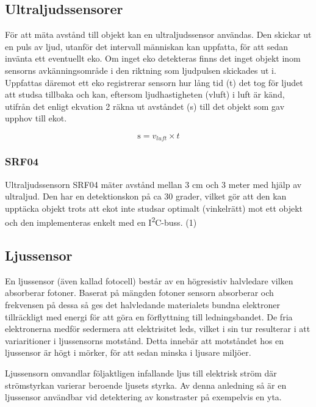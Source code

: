 \documentclass[11pt]{article}
\begin{document}
\begin{flushleft}


\subsection{Ultraljudssensorer}
För att mäta avstånd till objekt kan en ultraljudssensor användas. Den skickar ut en puls av ljud, utanför det intervall människan kan uppfatta, för att sedan invänta ett eventuellt eko. Om inget eko detekteras finns det inget objekt inom sensorns avkänningsområde i den riktning som ljudpulsen skickades ut i. Uppfattas däremot ett eko registrerar sensorn hur lång tid (t) det tog för ljudet att studsa tillbaka och kan, eftersom ljudhastigheten (vluft) i luft är känd, utifrån det enligt ekvation 2 räkna ut avståndet (s) till det objekt som gav upphov till ekot. 

\begin{equation*}
	\textrm{s} = v_{luft} \times t						
\end{equation*}

\subsubsection{SRF04}
Ultraljudssensorn SRF04 mäter avstånd mellan 3 cm och 3 meter med hjälp av ultraljud. Den har en detektionskon på ca 30 grader, vilket gör att den kan upptäcka objekt trots att ekot inte studsar optimalt (vinkelrätt) mot ett objekt och den implementeras enkelt med en I\textsuperscript{2}C-buss. (1)



\subsection{Ljussensor}
En ljussensor (även kallad fotocell) består av en högresistiv halvledare vilken absorberar fotoner. Baserat på mängden fotoner sensorn absorberar och frekvensen på dessa så ges det halvledande materialets bundna elektroner tillräckligt med energi för att göra en förflyttning till ledningsbandet. De fria elektronerna medför sedermera att elektrisitet leds,  vilket i sin tur resulterar i att variaritioner i ljussensorns motstånd. Detta innebär att motståndet hos en ljussensor är högt i mörker, för att sedan minska i ljusare miljöer. \cite{612896}

Ljussensorn omvandlar följaktligen infallande ljus till elektrisk ström där strömstyrkan varierar beroende ljusets styrka. Av denna anledning så är en ljussensor användbar vid detektering av konstraster på exempelvis en yta.  \cite{612896}


\end{flushleft}
\end{document}
